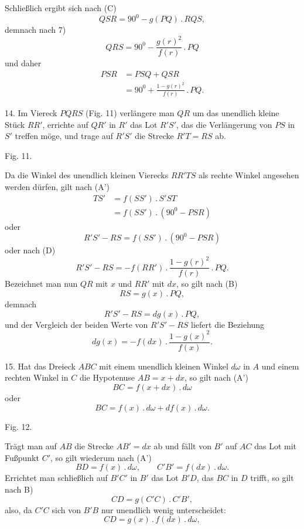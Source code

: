 %
\noindent Schließlich ergibt sich nach (C)
\[
QSR = 90^{0} - g(PQ) \,.\, RQS,
\]
demnach nach 7)
\[
QRS = 90^{0} - \frac{g(r)^2}{f(r)} \,.\, PQ
\]
und daher
\[
\tag*{(D)} \begin{aligned}PSR &= PSQ + QSR\\ &= 90^{0} + \frac{1 - g(r)^2}{f(r)} \,.\, PQ.\end{aligned}
\]

14. Im Viereck $PQRS$ (Fig. 11) verlängere man $QR$ um das unendlich kleine
Stück $RR'$, errichte auf $QR'$ in $R'$ das Lot $R'S'$, das die Verlängerung von
$PS$ in $S'$ treffen möge, und trage auf $R'S'$ die Strecke $R'T = RS$ ab.

\begin{center}\begin{minipage}{\linewidth}\centering


Fig. 11.
\end{minipage}\end{center}

Da die Winkel des unendlich kleinen Vierecks $RR'TS$ als rechte Winkel angesehen werden
dürfen, gilt nach (A')
\[
\begin{aligned}TS' &= f(SS') \,.\, S'ST\\ &= f(SS') \,.\, (90^{0} - PSR)\end{aligned}
\]
oder
\[
R'S' - RS = f(SS') \,.\, (90^{0} - PSR)
\]
oder nach (D)
\[
\tag*{8)} R'S' - RS = -f(RR') \,.\, \frac{1 - g(r)^2}{f(r)} \,.\, PQ.
\]
Bezeichnet man nun $QR$ mit $x$ und $RR'$ mit $dx$, so gilt nach (B)
\[
RS = g(x) \,.\, PQ,
\]
demnach
\[
\tag*{9)} R'S' - RS = dg(x) \,.\, PQ,
\]
und der Vergleich der beiden Werte von $R'S' - RS$ liefert die Beziehung
\[
\tag*{(E)} dg(x) = -f(dx) \,.\, \frac{1 - g(x)^2}{f(x)}.
\]

15. Hat das Dreieck $ABC$ mit einem unendlich kleinen Winkel $d\omega$ in $A$
und einem rechten Winkel in $C$ die Hypotenuse $AB = x + dx$, so gilt nach (A')
\[
BC = f(x + dx) \,.\, d\omega
\]
oder
\[
\tag*{10)} BC = f(x) \,.\, d\omega + df(x) \,.\, d\omega.
\]
\begin{center}\begin{minipage}{\linewidth}\centering


Fig. 12.
\end{minipage}\end{center}

Trägt man auf $AB$ die Strecke $AB' = dx$ ab und fällt von $B'$ auf $AC$ das Lot
mit Fußpunkt $C'$, so gilt wiederum nach (A')
\[
BD = f(x) \,.\, d\omega, \qquad C'B' = f(dx) \,.\, d\omega.
\]
Errichtet man schließlich auf $B'C'$ in $B'$ das Lot $B'D$, das $BC$ in $D$ trifft,
so gilt nach B)
\[
CD = g(C'C) \,.\, C'B',
\]
also, da $C'C$ sich von $B'B$ nur unendlich wenig unterscheidet:
\[
\tag*{11)} CD = g(x) \,.\, f(dx) \,.\, d\omega,
\]

